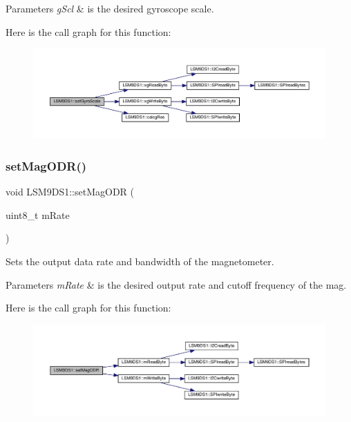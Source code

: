 \begin{DoxyParams}{Parameters}
{\em g\+Scl} & is the desired gyroscope scale. \\
\hline
\end{DoxyParams}
Here is the call graph for this function\+:
\nopagebreak
\begin{figure}[H]
\begin{center}
\leavevmode
\includegraphics[width=350pt]{classLSM9DS1_a115d304ebcdc8c701f3e5a5d397250aa_cgraph}
\end{center}
\end{figure}
\mbox{\label{classLSM9DS1_a8bc672fba680edc468a643fd58046b41}} 
\subsubsection{\texorpdfstring{set\+Mag\+O\+D\+R()}{setMagODR()}}
{\footnotesize\ttfamily void L\+S\+M9\+D\+S1\+::set\+Mag\+O\+DR (\begin{DoxyParamCaption}\item[{uint8\+\_\+t}]{m\+Rate }\end{DoxyParamCaption})}



Sets the output data rate and bandwidth of the magnetometer. 


\begin{DoxyParams}{Parameters}
{\em m\+Rate} & is the desired output rate and cutoff frequency of the mag. \\
\hline
\end{DoxyParams}
Here is the call graph for this function\+:
\nopagebreak
\begin{figure}[H]
\begin{center}
\leavevmode
\includegraphics[width=350pt]{classLSM9DS1_a8bc672fba680edc468a643fd58046b41_cgraph}
\end{center}
\end{figure}
\mbox{\label{classLSM9DS1_ad7604159a07b0d088cdfb6ba4a0093b0}} 
